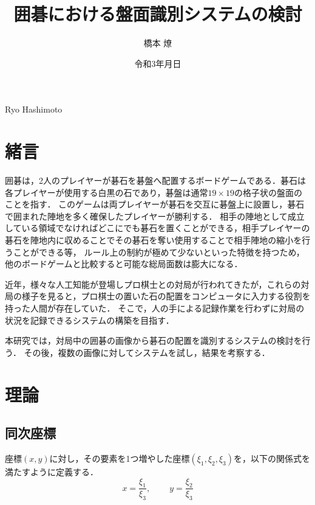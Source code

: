 \documentclass[summary]{nitocs}
\numberwithin{equation}{section}
\begin{document}
    \title{囲碁における盤面識別システムの検討}
    \author{橋本 燎}{Ryo Hashimoto} %

    \date{令和3年\number\month 月\number\day 日} 

    \maketitle
    \section{緒言} \label{intro}
        囲碁は，2人のプレイヤーが碁石を碁盤へ配置するボードゲームである．碁石は各プレイヤーが使用する白黒の石であり，碁盤は通常$19\times19$の格子状の盤面のことを指す．
        このゲームは両プレイヤーが碁石を交互に碁盤上に設置し，碁石で囲まれた陣地を多く確保したプレイヤーが勝利する．
        相手の陣地として成立している領域でなければどこにでも碁石を置くことができる，相手プレイヤーの碁石を陣地内に収めることでその碁石を奪い使用することで相手陣地の縮小を行うことができる等，
        ルール上の制約が極めて少ないといった特徴を持つため，他のボードゲームと比較すると可能な総局面数は膨大になる．

        近年，様々な人工知能が登場しプロ棋士との対局が行われてきたが，これらの対局の様子を見ると，プロ棋士の置いた石の配置をコンピュータに入力する役割を持った人間が存在していた．
        そこで，人の手による記録作業を行わずに対局の状況を記録できるシステムの構築を目指す．

        本研究では，対局中の囲碁の画像から碁石の配置を識別するシステムの検討を行う．
        その後，複数の画像に対してシステムを試し，結果を考察する．

    \section{理論} \label{theory}
        \subsection{同次座標}
            座標$(x,y)$に対し，その要素を1つ増やした座標$(\xi_1,\xi_2,\xi_3)$を，以下の関係式を満たすように定義する．\\
            \begin{equation} %
                    x = \frac{\xi_1}{\xi_3}, \;\;\;\;\;\;\;\; y = \frac{\xi_2}{\xi_3}
                \label{Homogeneous}
            \end{equation}
\end{document}
